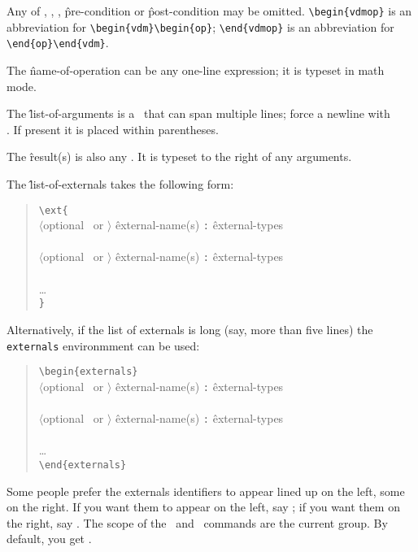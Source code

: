 {Any of \cs\args, \cs\res, \cs\ext, \^{pre-condition} or
\^{post-condition} may be omitted.  \verb;\begin{vdmop}; is an
abbreviation for \verb;\begin{vdm}\begin{op};;  \verb;\end{vdmop}; is an
abbreviation for \verb;\end{op}\end{vdm};.

The \^{name-of-operation} can be any one-line expression; it is
typeset in math mode.

The \^{list-of-arguments} is a \mmexp\ that can span multiple lines;
force a newline with \cs\\.  If present it is placed within
parentheses.

The \^{result(s)} is also any \mmexp.  It is typeset to the right of
any arguments.

The \^{list-of-externals} takes the following form:
\begin{verse}
\verb;\ext{;	\\
\quad $\langle$optional \cs\Rd\ or \cs\Wr$\rangle$
	\^{external-name(s)} {\tt :\/} \^{external-types} \cs\\ \\
\quad $\langle$optional \cs\Rd\ or \cs\Wr$\rangle$
	\^{external-name(s)} {\tt :\/} \^{external-types} \cs\\ \\
\dots \\
\verb;};
\end{verse}
Alternatively, if the list of externals is long (say, more than five
lines) the {\tt externals\/} environmment can be used:
\begin{verse}
\verb;\begin{externals};	\\
\quad $\langle$optional \cs\Rd\ or \cs\Wr$\rangle$
	\^{external-name(s)} {\tt :\/} \^{external-types} \cs\\ \\
\quad $\langle$optional \cs\Rd\ or \cs\Wr$\rangle$
	\^{external-name(s)} {\tt :\/} \^{external-types} \cs\\ \\
\dots \\
\verb;\end{externals};
\end{verse}
\begin{dangerous}
Some people prefer the externals identifiers to appear lined up on the
left, some on the right.  If you want them to appear on the left, say
\cs\leftExternals; if you want them on the right, say
\cs\rightExternals.  The scope of the \cs\leftExternals\ and
\cs\rightExternals\ commands are the current group.  By default,
you get \cs\leftExternals.
\end{dangerous}


}
